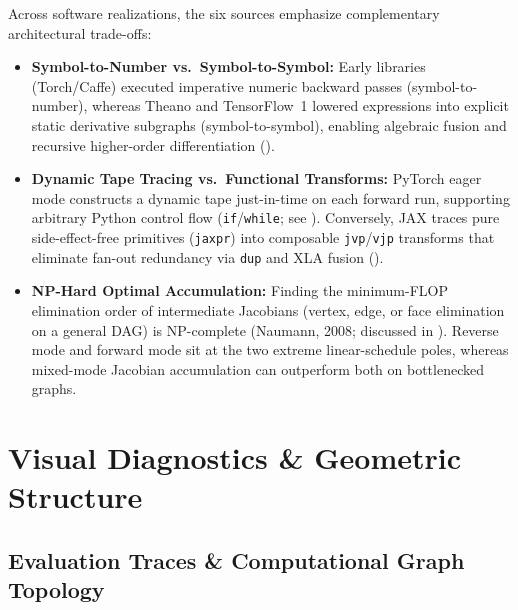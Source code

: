 \documentclass[../../../../master.tex]{subfiles}
\begin{document}
\begin{crossbook}
\label{box:matcalc:paradigms}
Across software realizations, the six sources emphasize complementary architectural trade-offs:
\begin{itemize}[leftmargin=1.5em]
  \item \textbf{Symbol-to-Number vs.\ Symbol-to-Symbol:} Early libraries (Torch/Caffe) executed imperative numeric backward passes (symbol-to-number), whereas Theano and TensorFlow~1 lowered expressions into explicit static derivative subgraphs (symbol-to-symbol), enabling algebraic fusion and recursive higher-order differentiation ().
  \item \textbf{Dynamic Tape Tracing vs.\ Functional Transforms:} PyTorch eager mode constructs a dynamic tape just-in-time on each forward run, supporting arbitrary Python control flow (\texttt{if}/\texttt{while}; see ). Conversely, JAX traces pure side-effect-free primitives (\texttt{jaxpr}) into composable \texttt{jvp}/\texttt{vjp} transforms that eliminate fan-out redundancy via \texttt{dup} and XLA fusion ().
  \item \textbf{NP-Hard Optimal Accumulation:} Finding the minimum-FLOP elimination order of intermediate Jacobians (vertex, edge, or face elimination on a general DAG) is NP-complete (Naumann, 2008; discussed in ). Reverse mode and forward mode sit at the two extreme linear-schedule poles, whereas mixed-mode Jacobian accumulation can outperform both on bottlenecked graphs.
\end{itemize}
\end{crossbook}

\section{Visual Diagnostics \& Geometric Structure}
\label{sec:matcalc:visuals}

\subsection{Evaluation Traces \& Computational Graph Topology}
\end{document}
